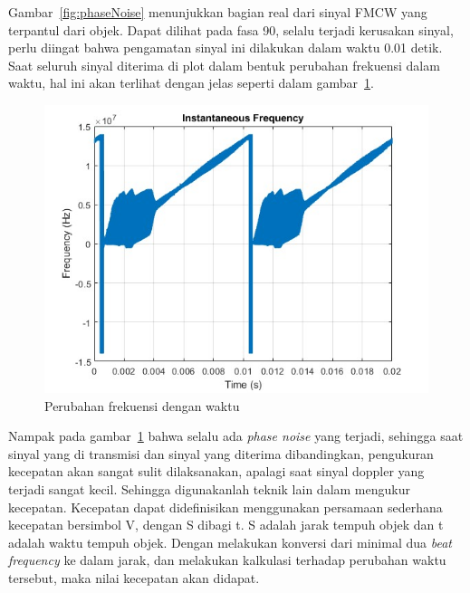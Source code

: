 Gambar~\ref{fig:phaseNoise} menunjukkan bagian real dari sinyal FMCW yang terpantul dari objek. Dapat dilihat pada fasa 90, selalu terjadi kerusakan sinyal, perlu diingat bahwa pengamatan sinyal ini dilakukan dalam waktu 0.01 detik. Saat seluruh sinyal diterima di plot dalam bentuk perubahan frekuensi dalam waktu, hal ini akan terlihat dengan jelas seperti dalam gambar~\ref{fig:instFreq}.

\begin{figure}
	\centering
	\includegraphics[scale=0.5]{pics/bab4/InstFreq.jpg}
	\caption{Perubahan frekuensi dengan waktu}
	\label{fig:instFreq}
\end{figure}

Nampak pada gambar~\ref{fig:instFreq} bahwa selalu ada \textit{phase noise} yang terjadi, sehingga saat sinyal yang di transmisi dan sinyal yang diterima dibandingkan, pengukuran kecepatan akan sangat sulit dilaksanakan, apalagi saat sinyal doppler yang terjadi sangat kecil. Sehingga digunakanlah teknik lain dalam mengukur kecepatan. Kecepatan dapat didefinisikan menggunakan persamaan sederhana kecepatan bersimbol V, dengan S dibagi t. S adalah jarak tempuh objek dan t adalah waktu tempuh objek. Dengan melakukan konversi dari minimal dua \textit{beat frequency} ke dalam jarak, dan melakukan kalkulasi terhadap perubahan waktu tersebut, maka nilai kecepatan akan didapat.


 


